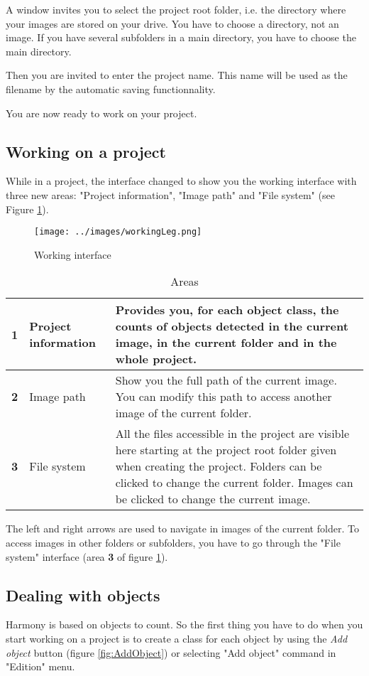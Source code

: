\documentclass{article}
\begin{document}
A window invites you to select the project root folder, i.e. the directory where your images are stored on your drive. You have to choose a directory, not an image. If you have several subfolders in a main directory, you have to choose the main directory.

Then you are invited to enter the project name. This name will be used as the filename by the automatic saving functionnality.

You are now ready to work on your project. 
\newpage

\subsection{Working on a project}
While in a project, the interface changed to show you the working interface with three new areas: "Project information", "Image path" and "File system" (see Figure \ref{fig:workingInt}).
\begin{figure}[!h]
  \centering
  \texttt{[image: ../images/workingLeg.png]}
  \caption{\label{fig:workingInt} Working interface}
\end{figure}

\begin{table}[!h]
  \centering
  \caption{\label{tab:workingInt} Areas}
  \begin{tabularx}{\textwidth}{l l Y }
    \hline
    \textbf{1} & Project information & Provides you, for each object class, the counts of objects detected in the current image, in the current folder and in the whole project. \\
    \hline
    \textbf{2} & Image path & Show you the full path of the current image. You can modify this path to access another image of the current folder. \\
    \hline
    \textbf{3} & File system & All the files accessible in the project are visible here starting at the project root folder given when creating the project. Folders can be clicked to change the current folder. Images can be clicked to change the current image. \\
    \hline
  \end{tabularx}
\end{table}
The left and right arrows are used to navigate in images of the current folder. To access images in other folders or subfolders, you have to go through the "File system" interface (area \textbf{3} of figure \ref{fig:workingInt}).
\newpage

\subsection{Dealing with objects}
Harmony is based on objects to count. So the first thing you have to do when you start working on a project is to create a class for each object by using the \emph{Add object} button (figure \ref{fig:AddObject}) or selecting "Add object" command in "Edition" menu.  
\end{document}
